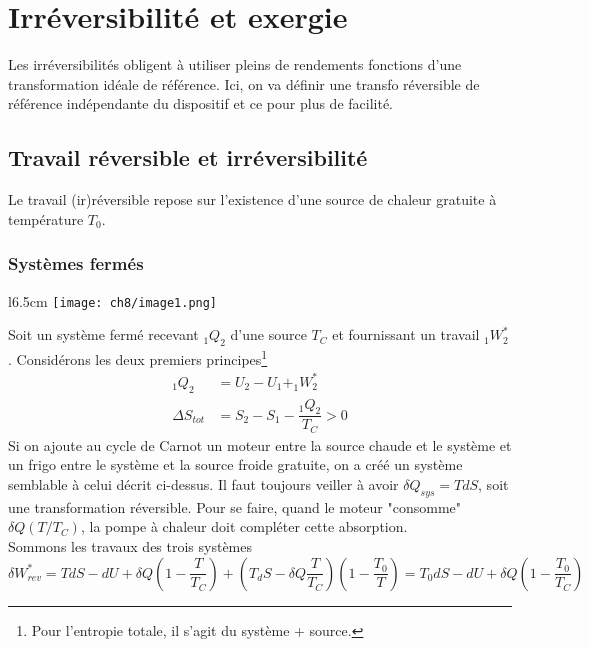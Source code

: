 \chapter{Irréversibilité et exergie}
Les irréversibilités obligent à utiliser pleins de rendements fonctions d'une 
transformation idéale de référence. Ici, on va définir une transfo réversible de 
référence indépendante du dispositif et ce pour plus de facilité.

	\section{Travail réversible et irréversibilité}
	Le travail (ir)réversible repose sur l'existence d'une source de chaleur 
	gratuite à température $T_0$.
	
		\subsection{Systèmes fermés}
			\begin{wrapfigure}[13]{l}{6.5cm}
	\texttt{[image: ch8/image1.png]}
	\end{wrapfigure}
		Soit un système fermé recevant $_1Q_2$ d'une source $T_C$ et fournissant 
		un travail $_1W_2^*$. Considérons les deux premiers principes\footnote{Pour 
		l'entropie totale, il s'agit du système + source.}
		\begin{equation}
		\begin{array}{ll}
		_1Q_2 &= U_2-U_1 + _1W_2^*\\
		\Delta S_{tot} &= S_2-S_1 - \dfrac{_1Q_2}{T_C}>0
		\end{array}
		\end{equation}
		Si on ajoute au cycle de Carnot un moteur entre la source chaude et le 
		système et un frigo entre le système et la source froide gratuite, on a 
		créé un système semblable à celui décrit ci-dessus. Il faut toujours veiller 
		à avoir $\delta Q_{sys} = TdS$, soit une transformation réversible. Pour se 
		faire, quand le moteur "consomme" $\delta Q(T/T_C)$, la pompe à chaleur doit 
		compléter cette absorption.\\
		Sommons les travaux des trois systèmes 
		\begin{equation}
		\delta W_{rev}^* = TdS - dU + \delta Q\left(1-\dfrac{T}{T_C}\right)+\left(
		T_dS - \delta Q \dfrac{T}{T_C}\right)\left(1-\dfrac{T_0}{T}\right) = T_0dS - dU + 
		\delta Q\left(1-\dfrac{T_0}{T_C}\right)
		\end{equation}
